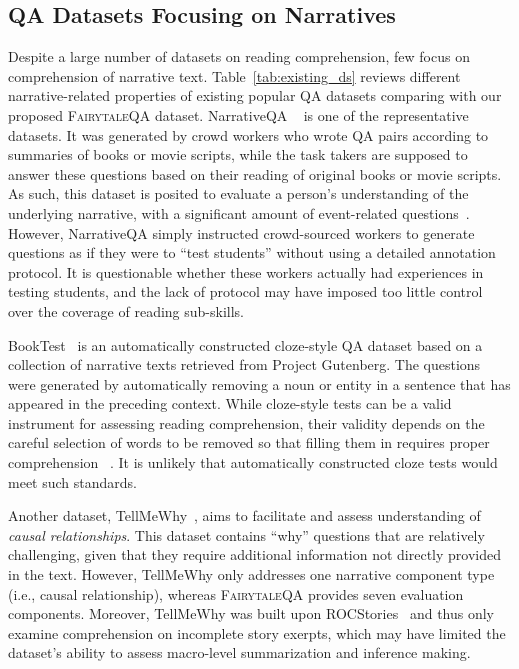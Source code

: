\documentclass[11pt]{article}
\newcommand{\datasetname}{\textsc{FairytaleQA}\xspace}
\begin{document}
\subsection{QA Datasets Focusing on Narratives}
Despite a large number of datasets on reading comprehension, few focus on comprehension of narrative text. Table~\ref{tab:existing_ds} reviews different narrative-related properties of existing popular QA datasets comparing with our proposed \datasetname dataset.
NarrativeQA ~\cite{kovcisky2018narrativeqa} is one of the representative datasets. It was generated by crowd workers who wrote QA pairs according to summaries of books or movie scripts, while the task takers are supposed to answer these questions based on their reading of original books or movie scripts. As such, this dataset is posited to evaluate a person's understanding of the underlying narrative, with a significant amount of event-related questions~\cite{mou2021narrative}. However, NarrativeQA simply instructed crowd-sourced workers to generate questions as if they were to ``test students'' without using a detailed annotation protocol. It is questionable whether these workers actually had experiences in testing students, and the lack of protocol may have imposed too little control over the coverage of reading sub-skills. 

BookTest~\cite{bajgar2016embracing} is an automatically constructed cloze-style QA dataset based on a collection of narrative texts retrieved from Project Gutenberg. The questions were generated by automatically removing a noun or entity in a sentence that has appeared in the preceding context. While cloze-style tests can be a valid instrument for assessing reading comprehension, their validity depends on the careful selection of words to be removed so that filling them in requires proper comprehension ~\cite{gellert2013cloze}. It is unlikely that automatically constructed cloze tests would meet such standards. 

Another dataset, TellMeWhy~\cite{lal2021tellmewhy}, aims to facilitate and assess understanding of \textit{causal relationships}. This dataset contains ``why'' questions that are relatively challenging, given that they require additional information not directly provided in the text. However, TellMeWhy only addresses one narrative component type (i.e., causal relationship), whereas \datasetname provides seven evaluation components. Moreover, TellMeWhy was built upon ROCStories~\cite{mostafazadeh2016corpus} and thus only examine comprehension on incomplete story exerpts, which may have limited the dataset's ability to assess macro-level summarization and inference making. 
\end{document}
